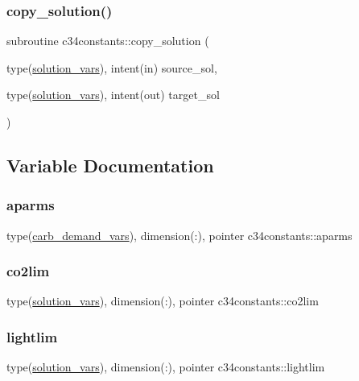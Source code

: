 \subsubsection{\texorpdfstring{copy\+\_\+solution()}{copy\_solution()}}
{\footnotesize\ttfamily subroutine c34constants\+::copy\+\_\+solution (\begin{DoxyParamCaption}\item[{type(\hyperlink{structc34constants_1_1solution__vars}{solution\+\_\+vars}), intent(in)}]{source\+\_\+sol,  }\item[{type(\hyperlink{structc34constants_1_1solution__vars}{solution\+\_\+vars}), intent(out)}]{target\+\_\+sol }\end{DoxyParamCaption})}



\subsection{Variable Documentation}
\mbox{\label{namespacec34constants_a844bf4288f019d9dcee7612f54d1e50c}} 
\subsubsection{\texorpdfstring{aparms}{aparms}}
{\footnotesize\ttfamily type(\hyperlink{structc34constants_1_1carb__demand__vars}{carb\+\_\+demand\+\_\+vars}), dimension(\+:), pointer c34constants\+::aparms}

\mbox{\label{namespacec34constants_abed7f7ff7745473ac53005a45206f506}} 
\subsubsection{\texorpdfstring{co2lim}{co2lim}}
{\footnotesize\ttfamily type(\hyperlink{structc34constants_1_1solution__vars}{solution\+\_\+vars}), dimension(\+:), pointer c34constants\+::co2lim}

\mbox{\label{namespacec34constants_af66eea644957075da5a5285e735e143b}} 
\subsubsection{\texorpdfstring{lightlim}{lightlim}}
{\footnotesize\ttfamily type(\hyperlink{structc34constants_1_1solution__vars}{solution\+\_\+vars}), dimension(\+:), pointer c34constants\+::lightlim}

